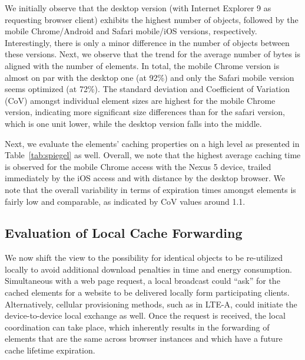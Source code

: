 \documentclass[letterpaper,journal,onecolumn,draftcls]{IEEEtran}
\begin{document}
We initially observe that the desktop version (with Internet Explorer 9 as requesting browser client) exhibits the highest number of objects, followed by the mobile Chrome/Android and Safari mobile/iOS versions, respectively. 
Interestingly, there is only a minor difference in the number of objects between these versions.
Next, we observe that the trend for the average number of bytes is aligned with the number of elements. 
In total, the mobile Chrome version is almost on par with the desktop one (at 92\%) and only the Safari mobile version seems optimized (at 72\%).
The standard deviation and Coefficient of Variation (CoV) amongst individual element sizes are highest for the mobile Chrome version, indicating more significant size differences than for the safari version, which is one unit lower, while the desktop version falls into the middle.

Next, we evaluate the elements' caching properties on a high level as presented in Table~\ref{tab:spiegel} as well. 
Overall, we note that the highest average caching time is observed for the mobile Chrome access with the Nexus 5 device, trailed immediately by the iOS access and with distance by the desktop browser.
We note that the overall variability in terms of expiration times amongst elements is fairly low and comparable, as indicated by CoV values around 1.1.

\subsection{Evaluation of Local Cache Forwarding}
We now shift the view to the possibility for identical objects to be re-utilized locally to avoid additional download penalties in time and energy consumption.
Simultaneous with a web page request, a local broadcast could ``ask'' for the cached elements for a website to be delivered locally form participating clients. Alternatively, cellular provisioning methods, such as in LTE-A, could initiate the device-to-device local exchange as well.
Once the request is received, the local coordination can take place, which inherently results in the forwarding of elements that are the same across browser instances and which have a future cache lifetime expiration.
\end{document}
